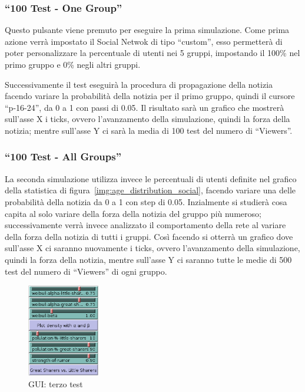 \subsubsection{``100 Test - One Group''}
Questo pulsante viene premuto per eseguire la prima simulazione. 
Come prima azione verrà impostato il Social Netwok di tipo ``custom'', esso permetterà di poter personalizzare
la percentuale di utenti nei 5 gruppi, impostando il 100\% nel primo gruppo e 0\% negli altri gruppi. 

Successivamente il test eseguirà la procedura di propagazione della notizia facendo variare la probabilità 
della notizia per il primo gruppo, quindi il cursore ``p-16-24'', da 0 a 1 con passi di 0.05.
Il risultato sarà un grafico che mostrerà sull'asse X i ticks, ovvero l'avanzamento della simulazione, quindi la forza della notizia; 
mentre sull'asse Y ci sarà la media di 100 test del numero di ``Viewers''.

\subsubsection{``100 Test - All Groups''}
La seconda simulazione utilizza invece le percentuali di utenti definite nel grafico della statistica di figura~\ref{img:age_distribution_social},
facendo variare una delle probabilità della notizia da 0 a 1 con step di 0.05.
Inzialmente si studierà cosa capita al solo variare della forza della notizia del gruppo più numeroso; 
successivamente verrà invece analizzato il comportamento della rete al variare della forza della notizia di tutti i gruppi.
Così facendo si otterrà un grafico dove sull'asse X ci saranno nuovamente i ticks, ovvero l'avanzamento della simulazione, quindi 
la forza della notizia, mentre sull'asse Y ci saranno tutte le medie di 500 test del numero di ``Viewers'' di ogni gruppo.

\begin{figure}
  \vspace*{-35pt}
  \begin{center}
    \includegraphics[width=0.28\textwidth]{img/gui-third-test.png}
  \end{center}
 \vspace*{-10pt}
 \caption{GUI: terzo test}
 \vspace*{-20pt}
 \label{img:gui_third_test}
\end{figure}



